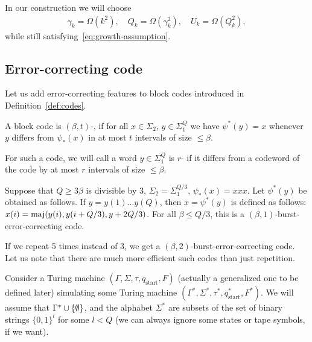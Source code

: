 \documentclass[11pt]{memoir}
\theoremstyle{definition} %
\renewcommand{\le}{\leq}
\renewcommand{\ge}{\geq}
\def\U{U}
\newcommand{\Q}{Q}
\newcommand{\start}{\mathrm{start}}
\begin{document}
In our construction we will choose
\begin{align*}
  \gamma_{k}=\Omega(k^{2}),
  \quad \Q_{k} = \Omega(\gamma_{k}^{2}),
  \quad \U_{k} = \Omega(\Q_{k}^{2}),
\end{align*}
while still satisfying~\eqref{eq:growth-assumption}.

\subsection{Error-correcting code}\label{sec:coding}

Let us add error-correcting features to block codes introduced in
Definition~\ref{def:codes}.

\begin{sloppypar}
\begin{definition}\label{def:err-code}
A block code is \( (\beta,t) \)-,
if for all \( x\in\Sigma_{2} \), \( y\in\Sigma_{1}^{\Q} \) we
have \( \psi^{*}(y)=x \) whenever \( y \) differs from
\( \psi_{*}(x) \) in at most \( t \) intervals of size \( \le\beta \).

For such a code, we will call a word \( y\in\Sigma_{1}^{\Q} \) is \( r \)-
if it differs from a codeword of the code by at most \( r \) intervals of size \( \le\beta \).
\end{definition}
  \end{sloppypar}

\begin{example}\label{xmp:tripling}
  Suppose that \( \Q\ge 3\beta \) is divisible by 3,
  \( \Sigma_{2}=\Sigma_{1}^{\Q/3} \), \( \psi_{*}(x)=xxx \).
  Let \( \psi^{*}(y) \) be obtained as follows.
  If \( y=y(1)\dots y(\Q) \), then \( x=\psi^{*}(y) \) is defined as follows:
    \( x(i)=\maj(y(i),y(i+\Q/3),y+2\Q/3) \).
    For all \( \beta\le \Q/3 \), this is a
    \( (\beta,1) \)-burst-error-correcting code.

    If we repeat 5 times instead of 3, we get a \( (\beta,2) \)-burst-error-correcting
    code.
    Let us note that there are much more efficient such codes than just repetition.
 \end{example}

Consider a Turing machine 
\( (\Gamma, \Sigma,\tau, q_{\start},F) \) (actually a generalized one to be defined later)
simulating some Turing machine \( (\Gamma^{*}, \Sigma^{*},\tau^{*}, q^{*}_{\start},F^{*}) \).
We will assume that \( \Gamma^{*}\cup\mathopen\{\emptyset\mathclose\} \),
and the alphabet \( \Sigma^{*} \) are subsets of the set of  binary strings
\( \{0,1\}^{l} \) for some \( l<\Q \) (we can always ignore some states or tape
symbols, if we want).
\end{document}

